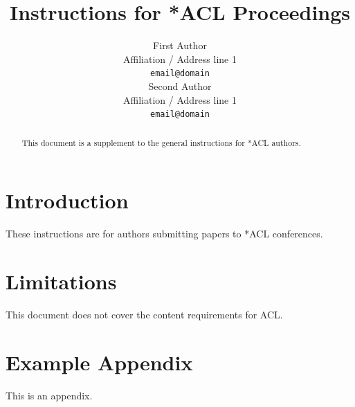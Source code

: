 \documentclass[11pt]{article}
\title{Instructions for *ACL Proceedings}
\author{First Author \\
  Affiliation / Address line 1 \\
  \texttt{email@domain} \\\And
  Second Author \\
  Affiliation / Address line 1 \\
  \texttt{email@domain} \\}
\begin{document}
\maketitle
\begin{abstract}
This document is a supplement to the general instructions for *ACL authors.
\end{abstract}

\section{Introduction}

These instructions are for authors submitting papers to *ACL conferences.

\section*{Limitations}

This document does not cover the content requirements for ACL.



\appendix

\section{Example Appendix}
\label{sec:appendix}

This is an appendix.
\end{document}
